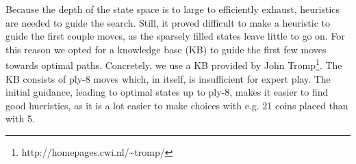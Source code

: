 Because the depth of the state space is to large to efficiently exhaust,
heuristics are needed to guide the search. Still, it proved difficult to make a
heuristic to guide the first couple moves, as the sparsely filled states leave
little to go on. For this reason we opted for a knowledge base (KB) to guide the
first few moves towards optimal paths. Concretely, we use a KB provided by John
Tromp\footnote{http://homepages.cwi.nl/\textasciitilde tromp/}. The KB consists
of ply-8 moves which, in itself, is insufficient for expert play. The initial
guidance, leading to optimal states up to ply-8, makes it easier to find good
hueristics, as it is a lot easier to make choices with e.g. 21 coins placed than
with 5.


